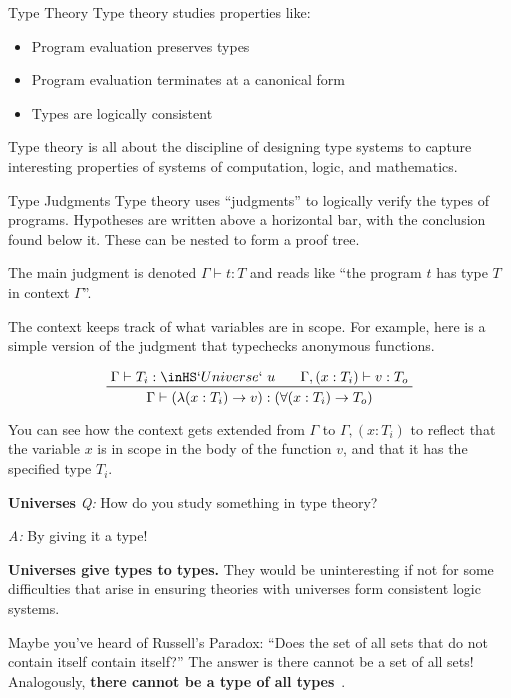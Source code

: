 \documentclass[12pt]{article}
\begin{document}
\begin{posterbard}
\begin{posterbox}{Type Theory}
Type theory studies properties like:
\begin{itemize}
\item Program evaluation preserves types
\item Program evaluation terminates at a canonical form
\item Types are logically consistent
\end{itemize}

Type theory is all about the discipline of designing type systems to capture interesting properties of systems of computation, logic, and mathematics.
\end{posterbox}

\begin{posterbox}{Type Judgments}
Type theory uses ``judgments'' to logically verify the types of programs.
Hypotheses are written above a horizontal bar, with the conclusion found below it.
These can be nested to form a proof tree.

The main judgment is denoted \(\Gamma \vdash t : T\) and reads like ``the program \(t\) has type \(T\) in context \(\Gamma\)''.

The context keeps track of what variables are in scope.
For example, here is a simple version of the judgment that typechecks anonymous functions.

\begin{displaymath}
\prftree{\Gamma \vdash T_i : \inHS`Universe`\ u\quad}{\Gamma, (x : T_i) \vdash v : T_o}{\Gamma \vdash (\lambda(x : T_i) \to v) : (\forall(x : T_i) \to T_o)}
\end{displaymath}

You can see how the context gets extended from \(\Gamma\) to \(\Gamma, (x : T_i)\) to reflect that the variable \(x\) is in scope in the body of the function \(v\), and that it has the specified type \(T_i\).

\end{posterbox}

\begin{posterbox}{\textbf{Universes}}
\textit{Q:} How do you study something in type theory?

\textit{A:} By giving it a type!

\textbf{Universes give types to types.}
They would be uninteresting if not for some difficulties that arise in ensuring theories with universes form consistent logic systems.

Maybe you've heard of Russell's Paradox:
``Does the set of all sets that do not contain itself contain itself?'' The answer is there cannot be a set of all sets! Analogously, \textbf{there cannot be a type of all types}~\cite{10.5555/645892.671442}.


\end{posterbox}
\end{posterbard}
\end{document}
